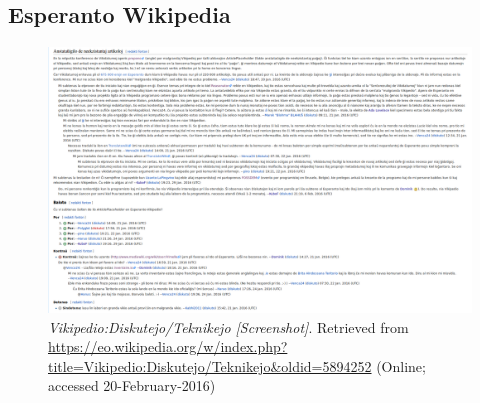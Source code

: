 \subsection{Esperanto Wikipedia}
\begin{figure}[H]
	\centering
	\includegraphics[width=\textwidth]{appendix/esperanto-wiki.png}
	\caption[a figure]{\textit{Vikipedio:Diskutejo/Teknikejo [Screenshot]}. Retrieved from \url{https://eo.wikipedia.org/w/index.php?title=Vikipedio:Diskutejo/Teknikejo&oldid=5894252} (Online; accessed 20-February-2016)}
	\label{fig:eowiki}
\end{figure}
